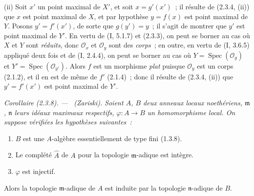 \documentclass[10pt,oneside]{book}
\newenvironment{corollary}[1][]{%
  \par\medskip\noindent\itshape Corollaire (#1). ---\ }{\par}
\begin{document}
(ii) Soit $x'$ un point maximal de $X'$, et soit $x=g'(x')$~; il résulte de
(2.3.4, (ii)) que $x$ est point maximal de $X$, et par hypothèse $y=f(x)$ est
point maximal de $Y$. Posons $y'=f'(x')$, de sorte que $g(y')=y$~; il s'agit
de montrer que $y'$ est point maximal de $Y'$. En vertu de (I, 5.1.7) et
(2.3.3), on peut se borner au cas où $X$ et $Y$ sont \emph{réduits}, donc
$\mathcal O_x$ et $\mathcal O_y$ sont des \emph{corps}~; en outre, en vertu de
(I, 3.6.5) appliqué deux fois et de (I, 2.4.4), on peut se borner au cas où
$Y=\operatorname{Spec}(\mathcal O_y)$ et
$Y'=\operatorname{Spec}(\mathcal O_{y'})$. Alors $f$ est un morphisme
\emph{plat} puisque $\mathcal O_y$ est un corps (2.1.2), et il en est de même
de $f'$ (2.1.4)~; donc il résulte de (2.3.4, (ii)) que $y'=f'(x')$ est point
maximal de $Y'$.

\begin{corollary}[2.3.8]
\label{IV.2.3.8-fr}
\emph{(Zariski).} Soient $A$, $B$ deux anneaux locaux noethériens,
$\mathfrak m$, $\mathfrak n$ leurs idéaux maximaux respectifs,
$\varphi:A\to B$ un homomorphisme local. On suppose vérifiées les hypothèses
suivantes~:
\begin{enumerate}
  \item[$1^\circ$] $B$ est une $A$-algèbre essentiellement de type fini
  (1.3.8).
  \item[$2^\circ$] Le complété $\widehat A$ de $A$ pour la topologie
  $\mathfrak m$-adique est intègre.
  \item[$3^\circ$] $\varphi$ est injectif.
\end{enumerate}
Alors la topologie $\mathfrak m$-adique de $A$ est induite par la topologie
$\mathfrak n$-adique de $B$.
\end{corollary}
\end{document}
